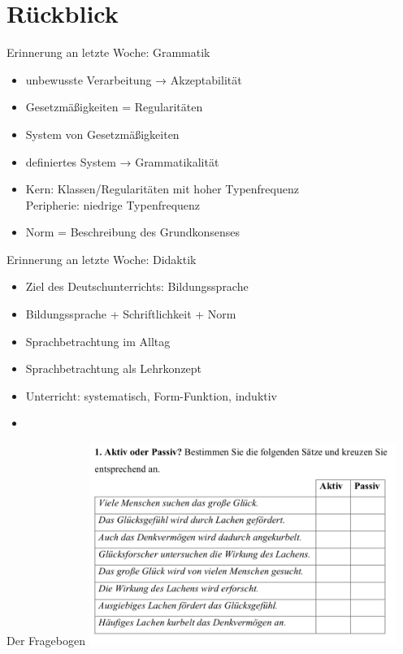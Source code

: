 
\section{Rückblick}

\begin{frame}
  {Erinnerung an letzte Woche: Grammatik}
  \pause
  \begin{itemize}[<+->]
    \item unbewusste Verarbeitung → Akzeptabilität
    \item Gesetzmäßigkeiten = Regularitäten
    \item \alert{System} von Gesetzmäßigkeiten
    \item \alert{definiertes} System → Grammatikalität
    \item \alert{Kern}: Klassen\slash Regularitäten mit hoher Typenfrequenz\\
      Peripherie: niedrige Typenfrequenz
    \item Norm = Beschreibung des Grundkonsenses
  \end{itemize}
\end{frame}

\begin{frame}
  {Erinnerung an letzte Woche: Didaktik}
  \pause
  \begin{itemize}[<+->]
    \item Ziel des Deutschunterrichts: \alert{Bildungssprache}
    \item Bildungssprache + Schriftlichkeit + Norm
    \item Sprachbetrachtung im Alltag
    \item Sprachbetrachtung als Lehrkonzept
    \item Unterricht: \alert{systematisch}, \alert{Form-Funktion}, \alert{induktiv}
    \vspace{\baselineskip}
  \item {}
  \end{itemize}
\end{frame}

\begin{frame}
  {Der Fragebogen}
  \pause
  \centering
  \includegraphics[width=0.75\textwidth]{graphics/01}
\end{frame}

